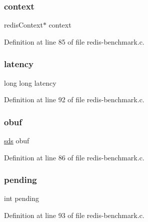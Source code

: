 \subsubsection{\texorpdfstring{context}{context}}
{\footnotesize\ttfamily redis\+Context$\ast$ context}



Definition at line 85 of file redis-\/benchmark.\+c.

\mbox{\label{struct__client_a63aa79bae38bf471f8ca0eb4ebcbc8ed}} 
\subsubsection{\texorpdfstring{latency}{latency}}
{\footnotesize\ttfamily long long latency}



Definition at line 92 of file redis-\/benchmark.\+c.

\mbox{\label{struct__client_af5085d41ae41882aee6dea2f34ce331b}} 
\subsubsection{\texorpdfstring{obuf}{obuf}}
{\footnotesize\ttfamily \hyperlink{sds_8h_ad69abac3df4532879db9642c95f5ef6f}{sds} obuf}



Definition at line 86 of file redis-\/benchmark.\+c.

\mbox{\label{struct__client_a79ec26d453dcd29aec17f5536233e849}} 
\subsubsection{\texorpdfstring{pending}{pending}}
{\footnotesize\ttfamily int pending}



Definition at line 93 of file redis-\/benchmark.\+c.

\mbox{\label{struct__client_ab2b94bf3cba7e73e2bc3e4a19ce3d713}} 
